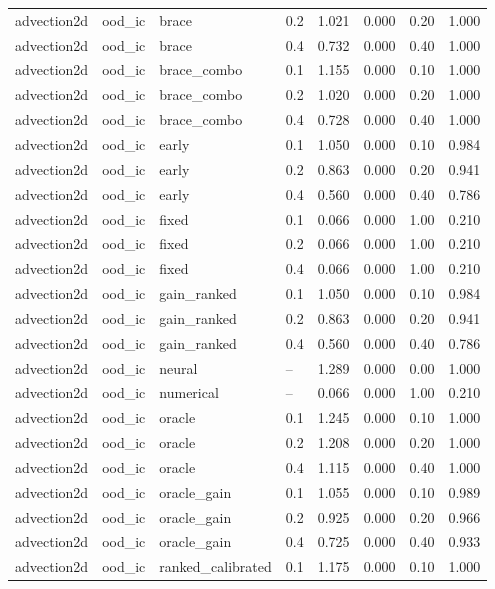 \begin{longtable}{llllrrrr}
advection2d & ood\_ic & brace & 0.2 & 1.021 & 0.000 & 0.20 & 1.000 \\
advection2d & ood\_ic & brace & 0.4 & 0.732 & 0.000 & 0.40 & 1.000 \\
advection2d & ood\_ic & brace\_combo & 0.1 & 1.155 & 0.000 & 0.10 & 1.000 \\
advection2d & ood\_ic & brace\_combo & 0.2 & 1.020 & 0.000 & 0.20 & 1.000 \\
advection2d & ood\_ic & brace\_combo & 0.4 & 0.728 & 0.000 & 0.40 & 1.000 \\
advection2d & ood\_ic & early & 0.1 & 1.050 & 0.000 & 0.10 & 0.984 \\
advection2d & ood\_ic & early & 0.2 & 0.863 & 0.000 & 0.20 & 0.941 \\
advection2d & ood\_ic & early & 0.4 & 0.560 & 0.000 & 0.40 & 0.786 \\
advection2d & ood\_ic & fixed & 0.1 & 0.066 & 0.000 & 1.00 & 0.210 \\
advection2d & ood\_ic & fixed & 0.2 & 0.066 & 0.000 & 1.00 & 0.210 \\
advection2d & ood\_ic & fixed & 0.4 & 0.066 & 0.000 & 1.00 & 0.210 \\
advection2d & ood\_ic & gain\_ranked & 0.1 & 1.050 & 0.000 & 0.10 & 0.984 \\
advection2d & ood\_ic & gain\_ranked & 0.2 & 0.863 & 0.000 & 0.20 & 0.941 \\
advection2d & ood\_ic & gain\_ranked & 0.4 & 0.560 & 0.000 & 0.40 & 0.786 \\
advection2d & ood\_ic & neural & -- & 1.289 & 0.000 & 0.00 & 1.000 \\
advection2d & ood\_ic & numerical & -- & 0.066 & 0.000 & 1.00 & 0.210 \\
advection2d & ood\_ic & oracle & 0.1 & 1.245 & 0.000 & 0.10 & 1.000 \\
advection2d & ood\_ic & oracle & 0.2 & 1.208 & 0.000 & 0.20 & 1.000 \\
advection2d & ood\_ic & oracle & 0.4 & 1.115 & 0.000 & 0.40 & 1.000 \\
advection2d & ood\_ic & oracle\_gain & 0.1 & 1.055 & 0.000 & 0.10 & 0.989 \\
advection2d & ood\_ic & oracle\_gain & 0.2 & 0.925 & 0.000 & 0.20 & 0.966 \\
advection2d & ood\_ic & oracle\_gain & 0.4 & 0.725 & 0.000 & 0.40 & 0.933 \\
advection2d & ood\_ic & ranked\_calibrated & 0.1 & 1.175 & 0.000 & 0.10 & 1.000 \\

\end{longtable}
